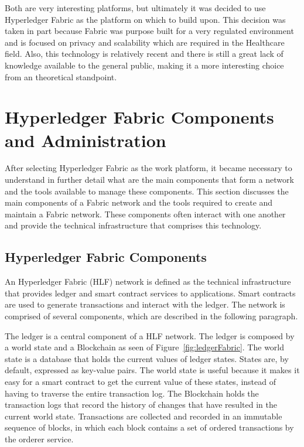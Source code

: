 Both are very interesting platforms, but ultimately it was decided to use
Hyperledger Fabric as the platform on which to build upon. This decision was
taken in part because Fabric was purpose built for a very regulated environment
and is focused on privacy and scalability which are required in the Healthcare
field. Also, this technology is relatively recent and there is still a great
lack of knowledge available to the general public, making it a more interesting
choice from an theoretical standpoint.

\section{Hyperledger Fabric Components and Administration}

After selecting Hyperledger Fabric as the work platform, it became necessary to
understand in further detail what are the main components that form a network and
the tools available to manage these components. This section discusses the main
components of a Fabric network and the tools required to create and maintain a
Fabric network. These components often interact with one another and provide
the technical infrastructure that comprises this technology.

\subsection{Hyperledger Fabric Components}

An Hyperledger Fabric (HLF) network is defined as the technical infrastructure
that provides ledger and smart contract services to applications. Smart
contracts are used to generate transactions and interact with the ledger. The
network is comprised of several components, which are described in the following paragraph.

The ledger is a central component of a HLF network. The ledger is composed by a
world state and a Blockchain as seen of Figure~\ref{fig:ledgerFabric}. The
world state is a database that holds the current values of ledger states.
States are, by default, expressed as key-value pairs. The world state is useful
because it makes it easy for a smart contract to get the current value of these
states, instead of having to traverse the entire transaction log. The
Blockchain holds the transaction logs that record the history of changes that
have resulted in the current world state.  Transactions are collected and
recorded in an immutable sequence of blocks, in which each block contains a set
of ordered transactions by the orderer service.

